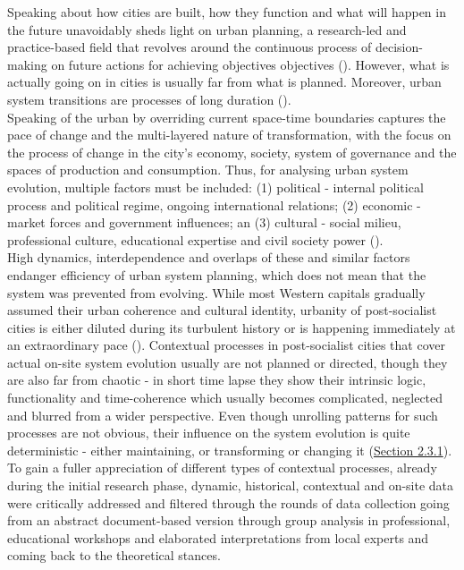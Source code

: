 \documentclass[11pt]{report}
\begin{document}
Speaking about how cities are built, how they function and what will happen in the future unavoidably sheds light on urban planning, a research-led and practice-based field that revolves around the continuous process of decision-making on future actions for achieving objectives objectives (\href{Stojkov}{\cite{Stojkov2012}}).
However, what is actually going on in cities is usually far from what is planned.
Moreover, urban system transitions are processes of long duration (\href{Braudel}{\cite{Braudel1970}}).
\\

Speaking of the urban by overriding current space-time boundaries captures the pace of change and the multi-layered nature of transformation, with the focus on the process of change in the city's economy, society, system of governance and the spaces of production and consumption.
Thus, for analysing urban system evolution, multiple factors must be included:
(1) political - internal political process and political regime, ongoing international relations;
(2) economic - market forces and government influences; 
an
(3) cultural - social milieu, professional  culture, educational  expertise and civil society power (\href{NedovicBudic}{\cite{NedovicBudicAndCavric2006}}).
\\

High dynamics, interdependence and overlaps of these and similar factors endanger efficiency of urban system planning, which does not mean that the system was prevented from evolving.
While most Western capitals gradually assumed their urban coherence and cultural identity, urbanity of post-socialist cities is either diluted during its turbulent history or is happening immediately at an extraordinary pace (\href{Doytchinov}{\cite{Doytchinov2015}}).
Contextual processes in post-socialist cities that cover actual on-site system evolution usually are not planned or directed, though they are also far from chaotic - in short time lapse they show their intrinsic logic, functionality and time-coherence which usually becomes complicated, neglected and blurred from a wider perspective.
Even though unrolling patterns for such processes are not obvious, their influence on the system evolution is quite deterministic - either maintaining, or transforming or changing it (\href{Section 2.3.1}{Section 2.3.1}). 
\\

To gain a fuller appreciation of different types of contextual processes, already during the initial research phase, dynamic, historical, contextual and on-site data were critically addressed and filtered through the rounds of data collection going from an abstract document-based version through group analysis in professional, educational workshops and elaborated interpretations from local experts and coming back to the theoretical stances.
\\
\end{document}

